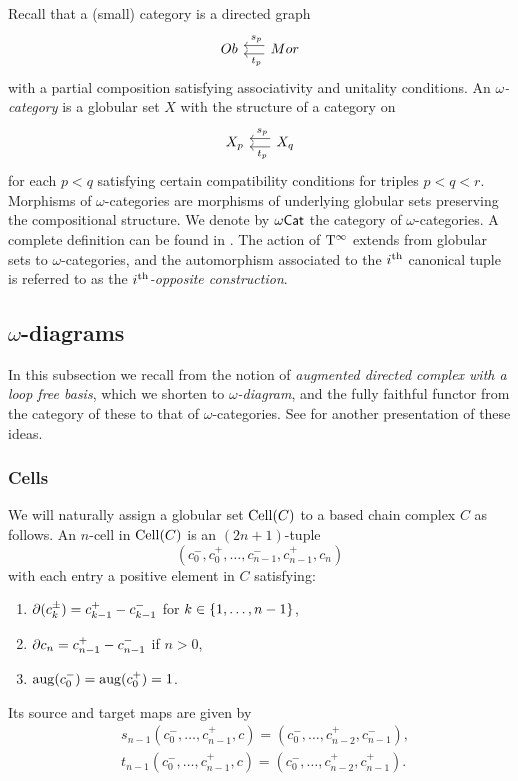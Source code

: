 Recall that a (small) category is a directed graph
\[
\begin{tikzcd}[column sep=15pt]
	Ob & \arrow[l,"\ s_p"',shift right=3pt] \arrow[l,"\ t_p",shift left=3pt] Mor
\end{tikzcd}
\]
with a partial composition satisfying associativity and unitality conditions.
An \textit{$\omega$-category} is a globular set $X$ with the structure of a category on
\[
\begin{tikzcd}[column sep=15pt]
	X_p & \arrow[l,"\ s_p"',shift right=3pt] \arrow[l,"\ t_p",shift left=3pt] X_q
\end{tikzcd}
\]
for each $p < q$ satisfying certain compatibility conditions for triples $p<q<r$.
Morphisms of $\omega$-categories are morphisms of underlying globular sets preserving the compositional structure.
We denote by $\omega\mathsf{Cat}$ the category of $\omega$-categories.
A complete definition can be found in \cite[\S1.2]{forest2022pasting}.
The action of $\mathrm{T}^\infty$ extends from globular sets to $\omega$-categories, and the automorphism associated to the $i^{\mathrm{th}}$ canonical tuple is referred to as the \textit{$i^{\mathrm{th}}$-opposite construction}.

\subsection{$\omega$-diagrams}

In this subsection we recall from \cite{steiner2004omega} the notion of \textit{augmented directed complex with a loop free basis}, which we shorten to \textit{$\omega$-diagram}, and the fully faithful functor from the category of these to that of $\omega$-categories.
See \cite[\S1.6]{forest2022pasting} for another presentation of these ideas.

\subsubsection{Cells}

We will naturally assign a globular set $\mathrm{Cell}(C)$ to a based chain complex $C$ as follows.
An $n$-cell in $\mathrm{Cell}(C)$ is an $(2n+1)$-tuple
\[
(c_0^-,c_0^+,\dots,c_{n-1}^-,c_{n-1}^+,c_n)
\]
with each entry a positive element in $C$ satisfying:
\begin{enumerate}
	\item $\partial(c_k^\pm) = c_{k-1}^+ - c_{k-1}^-$ for $k \in \{1,\dots,n-1\}$,
	\item $\partial c_n = c_{n-1}^+ - c_{n-1}^-$ if $n > 0$,
	\item $\operatorname{aug}(c_0^-) = \operatorname{aug}(c_0^+) = 1$.
\end{enumerate}
Its source and target maps are given by
\begin{align*}
	&s_{n-1}(c_0^-, \dots, c_{n-1}^+, c) =
	(c_0^-, \dots, c_{n-2}^+, c_{n-1}^-), \\
	&t_{n-1}(c_0^-, \dots, c_{n-1}^+, c) =
	(c_0^-, \dots, c_{n-2}^+, c_{n-1}^+).
\end{align*}

